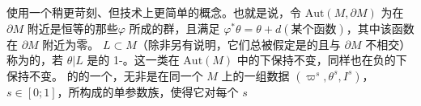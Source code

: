 使用一个稍更苛刻、但技术上更简单的\trAutomorphism{}概念。也就是说，令 $\mathrm{Aut}(M,\partial M)$ 为在
$\partial M$ 附近是恒等的那些\trDiffeomorphism{}$\varphi$ 所成的群，且满足
$\varphi^*\theta=\theta+d(\text{某个函数})$，其中该函数在 $\partial M$ 附近为零。
\trLagrange\trSubmanifold{}$L\subset M$（除非另有说明，它们总被假定是\trClosed{}的且与 $\partial M$%
不相交）称为\trExact{}的，若 $\theta|L$ 是\trExact{}的 1-\trForm。这一类\trSubmanifold{}在%
$\mathrm{Aut}(M)$ 中的\trIsotopy{}下保持不变，同样也在负\trLiouville\trVectorField{}的\trFlow{}下保持不变。
\trCorneredBoundary{}的\trExactSymplectic\trManifold{}的一个\trDeformation，无非是在同一个%
\trManifold{}$M$ 上的一组数据 $(\varpi^s,\theta^s,I^s)$，$s\in[0;1]$，所构成的单参数族，使得它对每个 $s$
